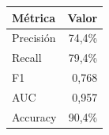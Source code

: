 
\begin{tabular}{lr}
\toprule
Métrica & Valor\\
\midrule
Precisión & 74,4\%\\
Recall & 79,4\%\\
F1 & 0,768\\
AUC & 0,957\\
Accuracy & 90,4\%\\
\bottomrule
\end{tabular}
